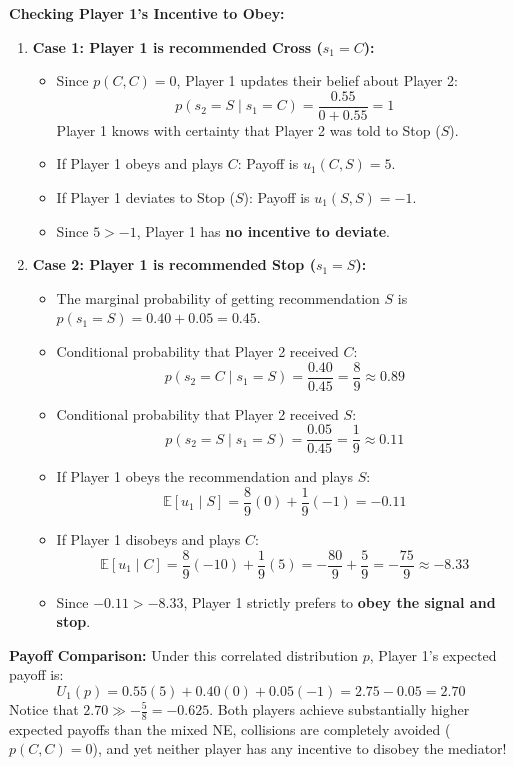 \documentclass[12pt, a4paper]{article}
\begin{document}
\textbf{Checking Player 1's Incentive to Obey:}
\begin{enumerate}
    \item \textbf{Case 1: Player 1 is recommended Cross ($s_1 = C$):}
    \begin{itemize}
        \item Since $p(C, C) = 0$, Player 1 updates their belief about Player 2:
        \[
          p(s_2 = S \mid s_1 = C) = \frac{0.55}{0 + 0.55} = 1
        \]
        Player 1 knows with certainty that Player 2 was told to Stop ($S$).
        \item If Player 1 obeys and plays $C$: Payoff is $u_1(C, S) = 5$.
        \item If Player 1 deviates to Stop ($S$): Payoff is $u_1(S, S) = -1$.
        \item Since $5 > -1$, Player 1 has \textbf{no incentive to deviate}.
    \end{itemize}
    
    \item \textbf{Case 2: Player 1 is recommended Stop ($s_1 = S$):}
    \begin{itemize}
        \item The marginal probability of getting recommendation $S$ is $p(s_1 = S) = 0.40 + 0.05 = 0.45$.
        \item Conditional probability that Player 2 received $C$:
        \[
          p(s_2 = C \mid s_1 = S) = \frac{0.40}{0.45} = \frac{8}{9} \approx 0.89
        \]
        \item Conditional probability that Player 2 received $S$:
        \[
          p(s_2 = S \mid s_1 = S) = \frac{0.05}{0.45} = \frac{1}{9} \approx 0.11
        \]
        \item If Player 1 obeys the recommendation and plays $S$:
        \[
          \mathbb{E}[u_1 \mid S] = \frac{8}{9}(0) + \frac{1}{9}(-1) = -0.11
        \]
        \item If Player 1 disobeys and plays $C$:
        \[
          \mathbb{E}[u_1 \mid C] = \frac{8}{9}(-10) + \frac{1}{9}(5) = -\frac{80}{9} + \frac{5}{9} = -\frac{75}{9} \approx -8.33
        \]
        \item Since $-0.11 > -8.33$, Player 1 strictly prefers to \textbf{obey the signal and stop}.
    \end{itemize}
\end{enumerate}

\begin{takebox}
\textbf{Payoff Comparison:}
Under this correlated distribution $p$, Player 1's expected payoff is:
\[
  U_1(p) = 0.55(5) + 0.40(0) + 0.05(-1) = 2.75 - 0.05 = 2.70
\]
Notice that $2.70 \gg -\frac{5}{8} = -0.625$. Both players achieve substantially higher expected payoffs than the mixed NE, collisions are completely avoided ($p(C, C) = 0$), and yet neither player has any incentive to disobey the mediator!
\end{takebox}
\end{document}
